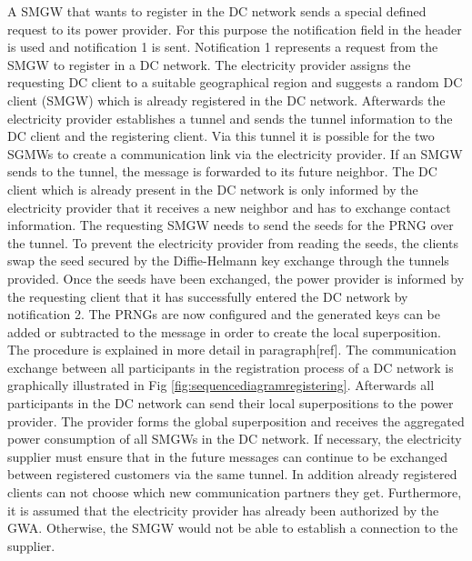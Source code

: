 A SMGW that wants to register in the DC network sends a special defined request to its power provider. For this purpose the notification field in the header is used and notification 1 is sent. Notification 1 represents a request from the SMGW to register in a DC network. The electricity provider assigns the requesting DC client to a suitable geographical region and suggests a random DC client (SMGW) which is already registered in the DC network. Afterwards the electricity provider establishes a tunnel and sends the tunnel information to the DC client and the registering client. Via this tunnel it is possible for the two SGMWs to create a communication link via the electricity provider. If an SMGW sends to the tunnel, the message is forwarded to its future neighbor. The DC client which is already present in the DC network is only informed by the electricity provider that it receives a new neighbor and has to exchange contact information. The requesting SMGW needs to send the seeds for the PRNG over the tunnel. To prevent the electricity provider from reading the seeds, the clients swap the seed secured by the Diffie-Helmann key exchange through the tunnels provided.%
Once the seeds have been exchanged, the power provider is informed by the requesting client that it has successfully entered the DC network by notification 2. The PRNGs are now configured and the generated keys can be added or subtracted to the message in order to create the local superposition. The procedure is explained in more detail in paragraph[ref].%
The communication exchange between all participants in the registration process of a DC network is graphically illustrated in Fig \ref{fig:sequencediagramregistering}. %
Afterwards all participants in the DC network can send their local superpositions to the power provider. The provider forms the global superposition and receives the aggregated power consumption of all SMGWs in the DC network. If necessary, the electricity supplier must ensure that in the future messages can continue to be exchanged between registered customers via the same tunnel. In addition already registered clients can not choose which new communication partners they get. Furthermore, it is assumed that the electricity provider has already been authorized by the GWA. Otherwise, the SMGW would not be able to establish a connection to the supplier.\\
